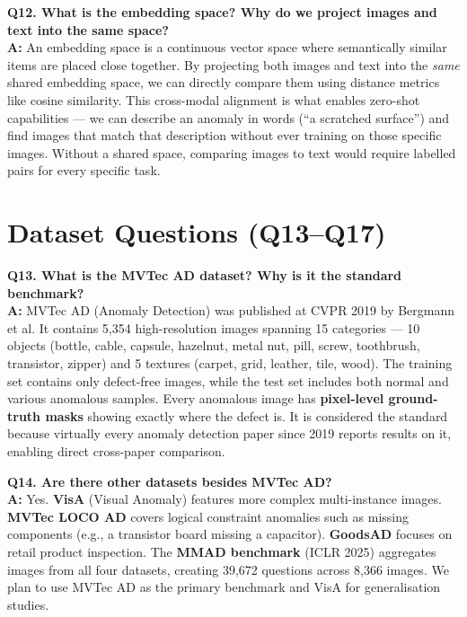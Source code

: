\documentclass[12pt, a4paper]{article}
\begin{document}
\begin{qa}
\textbf{Q12. What is the embedding space? Why do we project images and text into the same space?}\\[4pt]
\textbf{A:} An embedding space is a continuous vector space where semantically similar items are placed close together. By projecting both images and text into the \textit{same} shared embedding space, we can directly compare them using distance metrics like cosine similarity. This cross-modal alignment is what enables zero-shot capabilities --- we can describe an anomaly in words (``a scratched surface'') and find images that match that description without ever training on those specific images. Without a shared space, comparing images to text would require labelled pairs for every specific task.
\end{qa}

\section{Dataset Questions (Q13--Q17)}

\begin{qa}
\textbf{Q13. What is the MVTec AD dataset? Why is it the standard benchmark?}\\[4pt]
\textbf{A:} MVTec AD (Anomaly Detection) was published at CVPR 2019 by Bergmann et al. It contains 5,354 high-resolution images spanning 15 categories --- 10 objects (bottle, cable, capsule, hazelnut, metal nut, pill, screw, toothbrush, transistor, zipper) and 5 textures (carpet, grid, leather, tile, wood). The training set contains only defect-free images, while the test set includes both normal and various anomalous samples. Every anomalous image has \textbf{pixel-level ground-truth masks} showing exactly where the defect is. It is considered the standard because virtually every anomaly detection paper since 2019 reports results on it, enabling direct cross-paper comparison.
\end{qa}

\begin{qa}
\textbf{Q14. Are there other datasets besides MVTec AD?}\\[4pt]
\textbf{A:} Yes. \textbf{VisA} (Visual Anomaly) features more complex multi-instance images. \textbf{MVTec LOCO AD} covers logical constraint anomalies such as missing components (e.g., a transistor board missing a capacitor). \textbf{GoodsAD} focuses on retail product inspection. The \textbf{MMAD benchmark} (ICLR 2025) aggregates images from all four datasets, creating 39,672 questions across 8,366 images. We plan to use MVTec AD as the primary benchmark and VisA for generalisation studies.
\end{qa}
\end{document}
